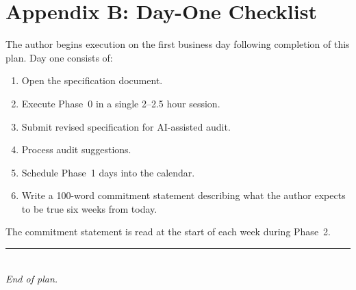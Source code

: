 \documentclass[11pt,letterpaper]{article}
\begin{document}
\section*{Appendix B: Day-One Checklist}

The author begins execution on the first business day following completion of this plan. Day one consists of:

\begin{enumerate}
  \item Open the specification document.
  \item Execute Phase~0 in a single 2--2.5 hour session.
  \item Submit revised specification for AI-assisted audit.
  \item Process audit suggestions.
  \item Schedule Phase~1 days into the calendar.
  \item Write a 100-word commitment statement describing what the author expects to be true six weeks from today.
\end{enumerate}

The commitment statement is read at the start of each week during Phase~2.

\vspace{2em}
\begin{center}
\rule{0.5\textwidth}{0.4pt}\\[0.5em]
{\footnotesize\color{soft}\itshape End of plan.}
\end{center}
\end{document}
